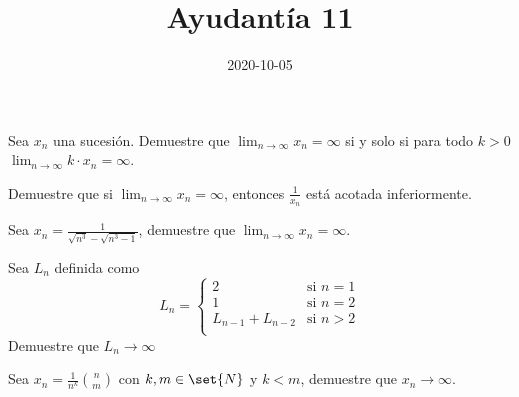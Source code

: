 \documentclass{ayudantia}
\title{Ayudantía 11}
\date{2020-10-05}
\begin{document}
\maketitle

\begin{prob}
    Sea \(x_n\) una sucesión. Demuestre que \(\lim_{n\rightarrow\infty}x_n=\infty\) si y solo si para todo \(k>0\) \(\lim_{n\rightarrow\infty}k\cdot x_n=\infty\).
\end{prob}

\begin{ans}
    \begin{sol}

\end{sol}
\end{ans}


\begin{prob}
    Demuestre que si \(\lim_{n\rightarrow\infty}x_n=\infty\), entonces \(\frac1{x_n}\) está acotada inferiormente.
\end{prob}

\begin{ans}
    \begin{sol}

\end{sol}
\end{ans}


\begin{prob}
    Sea \(x_n=\frac1{\sqrt{n^3}-\sqrt{n^3-1}}\), demuestre que \(\lim_{n\rightarrow\infty}x_n=\infty\).
\end{prob}

\begin{ans}
    \begin{sol}

\end{sol}
\end{ans}


\begin{prob}
    Sea \(L_n\) definida como
    \begin{equation*}
        L_n=\begin{cases}
            2 &\text{si }n=1\\
            1 &\text{si }n=2\\
            L_{n-1}+L_{n-2} &\text{si }n>2\\
        \end{cases}
    \end{equation*}
    Demuestre que \(L_n\rightarrow\infty\) 
\end{prob}

\begin{ans}
    \begin{sol}

\end{sol}
\end{ans}



\begin{prob}
    Sea \(x_n=\frac1{n^k}\binom{n}{m}\) con \(k,m\in\set{N}\) y \(k< m\), demuestre que \(x_n\rightarrow\infty\).
\end{prob}

\begin{ans}
    \begin{sol}

\end{sol}
\end{ans}
\end{document}
